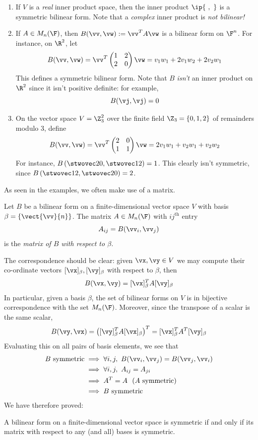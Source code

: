 \begin{examples}[label=exs:bilinear]
\begin{enumerate}
	\item If $V$ is a \emph{real} inner product space, then the inner product $\ip{\ ,\ }$ is a symmetric bilinear form. Note that a \emph{complex} inner product is \emph{not bilinear!}
	
	\item\label{ex:bilinear1} If $A\in M_n(\F)$, then $B(\vv,\vw):=\vv^TA\vw$ is a bilinear form on $\F^n$. For instance, on $\R^2$, let
	\[B(\vv,\vw)=\vv^T\begin{pmatrix}
	1&2\\2&0
	\end{pmatrix}\vw =v_1w_1+2v_1w_2+2v_2w_1\]
	This defines a symmetric bilinear form. Note that $B$ \emph{isn't} an inner product on $\R^2$ since it isn't positive definite: for example,
	\[B(\vj,\vj)=0\]
	
  \item On the vector space $V=\Z_3^2$ over the finite field $\Z_3=\{0,1,2\}$ of remainders modulo 3, define
  \[B(\vv,\vw)=\vv^T\begin{pmatrix}
	2&0\\1&1
	\end{pmatrix}\vw=2v_1w_1+v_2w_1+v_2w_2\]
	For instance, $B\left(\stwovec 20,\stwovec 12\right)=1$. This clearly isn't symmetric, since $B\left(\stwovec 12,\stwovec 20\right)=2$.
\end{enumerate}
\end{examples}

As seen in the examples, we often make use of a matrix.

\begin{defn}{}{}
Let $B$ be a bilinear form on a finite-dimensional vector space $V$ with basis $\beta=\{\vect{\vv}{n}\}$. The matrix $A\in M_n(\F)$ with $ij^\text{th}$ entry
\[A_{ij}=B(\vv_i,\vv_j)\]
is the \emph{matrix of $B$ with respect to $\beta$.}
\end{defn}

The correspondence should be clear: given $\vx,\vy\in V$ we may compute their co-ordinate vectors $[\vx]_\beta,[\vy]_\beta$ with respect to $\beta$, then
\[B(\vx,\vy)=[\vx]_\beta^TA[\vy]_\beta\]
In particular, given a basis $\beta$, the set of bilinear forms on $V$ is in bijective correspondence with the set $M_n(\F)$. Moreover, since the transpose of a scalar is the same scalar,
\[B(\vy,\vx)=\left([\vy]_\beta^TA[\vx]_\beta\right)^T=[\vx]_\beta^TA^T[\vy]_\beta\]
Evaluating this on all pairs of basis elements, we see that
\begin{align*}
B\text{ symmetric}&\implies \forall i,j,\ B(\vv_i,\vv_j)=B(\vv_j,\vv_i)\\
&\implies \forall i,j,\ A_{ij}=A_{ji}\\
&\implies A^T=A\text{\ \ ($A$ symmetric)}\\
&\implies B\text{ symmetric}
\end{align*}
We have therefore proved:
\begin{lemm}{}{}
A bilinear form on a finite-dimensional vector space is symmetric if and only if its matrix with respect to any (and all) bases is symmetric.
\end{lemm}


